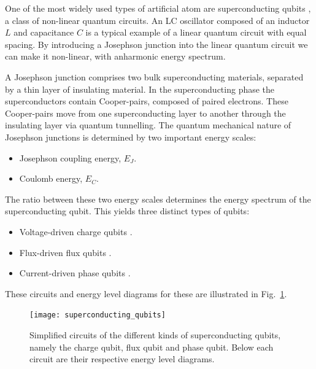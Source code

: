 One of the most widely used types of artificial atom are superconducting qubits \cite{bib:martinis1985energy, bib:shnirman1997quantum, bib:averin1998adiabatic, bib:devoret2004superconducting, bib:makhlin2001quantum}, a class of non-linear quantum circuits. An LC oscillator composed of an inductor $L$ and capacitance $C$ is a typical example of a linear quantum circuit with equal spacing. By introducing a Josephson junction into the linear quantum circuit we can make it non-linear, with anharmonic energy spectrum.

A Josephson junction \cite{bib:josephson1974the} comprises two bulk superconducting materials, separated by a thin layer of insulating material. In the superconducting phase the superconductors contain Cooper-pairs, composed of paired electrons. These Cooper-pairs move from one superconducting layer to another through the insulating layer via quantum tunnelling. The quantum mechanical nature of Josephson junctions is determined by two important energy scales:
\begin{itemize}
\item Josephson coupling energy, $E_{J}$.
\item Coulomb energy, $E_C$.
\end{itemize}
The ratio between these two energy scales determines the energy spectrum of the superconducting qubit. This yields three distinct types of qubits:
\begin{itemize}
\item Voltage-driven charge qubits \cite{bib:bouchiat1998quantum, bib:nakamura1999coherent}.
	\item Flux-driven flux qubits \cite{bib:friedman2000quantum, bib:van2000quantum}.
	\item Current-driven phase qubits \cite{bib:martinis2002rabi}.
\end{itemize} 
These circuits and energy level diagrams for these are illustrated in Fig.~\ref{fig:superconductor_circuits}.

\begin{figure}[!htbp]
\texttt{[image: superconducting\_qubits]}
\captionspacefig \caption{Simplified circuits of the different kinds of superconducting qubits, namely the charge qubit, flux qubit and phase qubit. Below each circuit are their respective energy level diagrams.}\label{fig:superconductor_circuits}
\end{figure}

